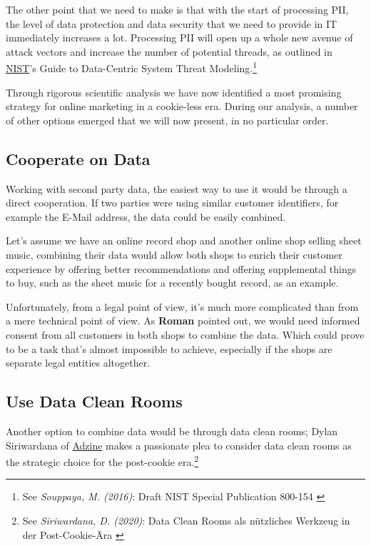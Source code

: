 The other point that we need to make is that with the start of processing PII, the level of data protection and data security that we need to provide in IT immediately increases a lot. Processing PII will open up a whole new avenue of attack vectors and increase the number of potential threads, as outlined in \href{https://www.nist.gov/}{NIST}'s Guide to Data-Centric System Threat Modeling.\footnote{See \textit{Souppaya, M. (2016)}: Draft NIST Special Publication 800-154 \cite{sp800_154_draft}}

Through rigorous scientific analysis we have now identified a most promising strategy for online marketing in a cookie-less era. During our analysis, a number of other options emerged that we will now present, in no particular order.

\subsection{Cooperate on Data}

Working with second party data, the easiest way to use it would be through a direct cooperation. If two parties were using similar customer identifiers, for example the E-Mail address, the data could be easily combined. 

Let's assume we have an online record shop and another online shop selling sheet music, combining their data would allow both shops to enrich their customer experience by offering better recommendations and offering supplemental things to buy, such as the sheet music for a recently bought record, as an example.

Unfortunately, from a legal point of view, it's much more complicated than from a mere technical point of view. As \textbf{Roman} pointed out, we would need informed consent from all customers in both shops to combine the data. Which could prove to be a task that's almost impossible to achieve, especially if the shops are separate legal entities altogether.

\subsection{Use Data Clean Rooms}

Another option to combine data would be through data clean rooms; Dylan Siriwardana of \href{https://www.adzine.de/}{Adzine} makes a passionate plea to consider data clean rooms as the strategic choice for the post-cookie era.\footnote{See \textit{Siriwardana, D. (2020)}: Data Clean Rooms als nützliches Werkzeug in der Post-Cookie-Ära \cite{dataClean}}

